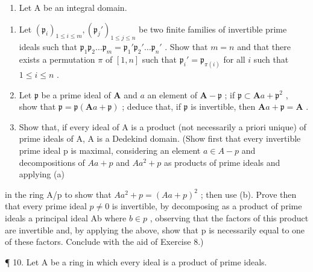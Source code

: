 \begin{enumerate}
\def\labelenumi{\arabic{enumi}.}
\setcounter{enumi}{8}
\tightlist
\item
  Let A be an integral domain.
\end{enumerate}

\begin{enumerate}
\def\labelenumi{(\alph{enumi})}
\item
  Let \((\mathfrak{p}_i)_{1\leqslant i\leqslant m},(\mathfrak{p}_j')_{1\leqslant j\leqslant n}\) be two finite families of invertible prime ideals such that \(\mathfrak{p}_1\mathfrak{p}_2\dots \mathfrak{p}_m = \mathfrak{p}_1'\mathfrak{p}_2'\dots \mathfrak{p}_n'\) . Show that \(m = n\) and that there exists a permutation \(\pi\) of \([1,n]\) such that \(\mathfrak{p}_i' = \mathfrak{p}_{\pi (i)}\) for all \(i\) such that \(1\leqslant i\leqslant n\) .
\item
  Let \(\mathfrak{p}\) be a prime ideal of \(\mathbf{A}\) and \(a\) an element of \(\mathbf{A} - \mathfrak{p}\) ; if \(\mathfrak{p} \subset \mathbf{A}a + \mathfrak{p}^2\) , show that \(\mathfrak{p} = \mathfrak{p}(\mathbf{A}a + \mathfrak{p})\) ; deduce that, if \(\mathfrak{p}\) is invertible, then \(\mathbf{A}a + \mathfrak{p} = \mathbf{A}\) .
\item
  Show that, if every ideal of A is a product (not necessarily a priori unique) of prime ideals of A, A is a Dedekind domain. (Show first that every invertible prime ideal p is maximal, considering an element \(a \in A - p\) and decompositions of \(Aa + p\) and \(Aa^{2} + p\) as products of prime ideals and applying (a)
\end{enumerate}

in the ring A/p to show that \(Aa^{2} + p = (Aa + p)^{2}\) ; then use (b). Prove then that every prime ideal \(p \neq 0\) is invertible, by decomposing as a product of prime ideals a principal ideal Ab where \(b \in p\) , observing that the factors of this product are invertible and, by applying the above, show that p is necessarily equal to one of these factors. Conclude with the aid of Exercise 8.)

¶ 10. Let A be a ring in which every ideal is a product of prime ideals.

